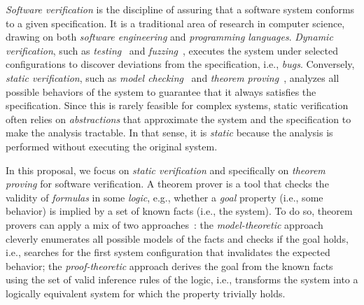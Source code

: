 
\textit{Software verification} is the discipline of assuring that a software system
conforms to a given specification. It is a traditional area of research in 
computer science, drawing on both \textit{software engineering} and 
\textit{programming languages}.
\textit{Dynamic verification}, such as \textit{testing}~\cite{ammann2016testing} and 
\textit{fuzzing}~\cite{zeller2024fuzzingbook},
executes the system under selected configurations to discover deviations from 
the specification, i.e., \textit{bugs}. 
Conversely, \textit{static verification}, such as \textit{model checking}~\cite{clarke2018modelchecking}
and \textit{theorem proving}~\cite{harrison2009theoremproving, kroening2016decision}, analyzes all possible behaviors of the
system
to guarantee that it always satisfies the specification. Since this is rarely
feasible for complex systems, static verification often relies on
\textit{abstractions} that approximate the system and the specification to make
the analysis tractable. In that sense, it is \textit{static} because the 
analysis is performed without executing the original system.

In this proposal, we focus on \textit{static verification} and specifically on
\textit{theorem proving} for software verification. A theorem prover is a tool
that checks the validity of \textit{formulas} in some \textit{logic},
e.g., whether a \textit{goal} property (i.e., some behavior) is implied by
a set of known facts (i.e., the system).
To do so, theorem provers can apply a mix of two approaches~\cite{kroening2016decision}: the 
\textit{model-theoretic} approach cleverly enumerates all possible
models of the facts and checks if the goal holds, i.e., searches for
the first system configuration that invalidates the expected behavior; the 
\textit{proof-theoretic} approach derives the goal from the 
known facts using the set of valid inference rules of the logic, i.e., 
transforms the system into a logically equivalent system for which the property 
trivially holds. 

